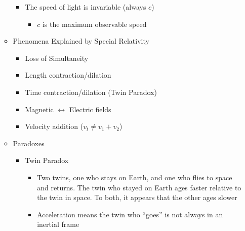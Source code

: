 \begin{itemize}
\begin{itemize}
\begin{itemize}
          \item The speed of light is invariable (always $c$)

            \begin{itemize}

              \item $c$ is the maximum observable speed

            \end{itemize}

        \end{itemize}

      \item Phenomena Explained by Special Relativity

        \begin{itemize}

          \item Loss of Simultaneity

          \item Length contraction/dilation

          \item Time contraction/dilation (Twin Paradox)

          \item Magnetic $\leftrightarrow$ Electric fields

          \item Velocity addition ($v_{t}\neq v_1+v_2$)

        \end{itemize}

      \item Paradoxes

        \begin{itemize}

          \item Twin Paradox

            \begin{itemize}

              \item Two twins, one who stays on Earth, and one who flies to space and returns. The twin who stayed on Earth ages faster relative to the twin in space. To both, it appears that the other ages slower

              \item Acceleration means the twin who ``goes'' is not always in an inertial frame

            \end{itemize}


\end{itemize}
\end{itemize}
\end{itemize}
